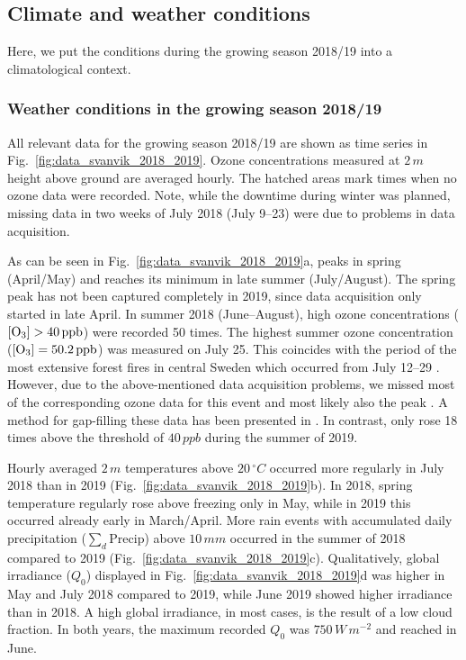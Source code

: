 \documentclass[bg, manuscript]{copernicus}
\begin{document}
\subsection{Climate and weather conditions}
\label{sec:stats}
Here, we put the conditions during the growing season 2018/19 into a climatological context.

\subsubsection{Weather conditions in the growing season 2018/19}
\label{subsec:weather}

All relevant data for the growing season 2018/19 are shown as time series in Fig.~\ref{fig:data_svanvik_2018_2019}. Ozone concentrations measured at $2\,\unit{m}$ height above ground are averaged hourly. The hatched areas mark times when no ozone data were recorded. Note, while the downtime during winter was planned, missing data in two weeks of July 2018 (July 9--23) were due to problems in data acquisition.

As can be seen in Fig.~\ref{fig:data_svanvik_2018_2019}a, \chem{[O_3]} peaks in spring (April/May) and reaches its minimum in late summer (July/August). The spring peak has not been captured completely in 2019, since data acquisition only started in late April. In summer 2018 (June--August), high ozone concentrations ($\chem{[O_3]} > 40\,\unit{ppb}$) were recorded 50 times. The highest summer ozone concentration ($\chem{[O_3]} = 50.2\,\unit{ppb}$) was measured on July 25. This coincides with the period of the most extensive forest fires in central Sweden which occurred from July 12--29 \citep{SOU2019}. However, due to the above-mentioned data acquisition problems, we missed most of the corresponding ozone data for this event and most likely also the peak \chem{[O_3]}. A method for gap-filling these data has been presented in \citet{ACP:Falk2021}. In contrast, \chem{[O_3]} only rose 18 times above the threshold of $40\,\unit{ppb}$ during the summer of 2019. 

Hourly averaged $2\,\unit{m}$ temperatures above $20\,\unit{^\circ C}$ occurred more regularly in July 2018 than in 2019 (Fig.~\ref{fig:data_svanvik_2018_2019}b). In 2018, spring temperature regularly rose above freezing only in May, while in 2019 this occurred already early in March/April.
More rain events with accumulated daily precipitation ($\sum_d \mathrm{Precip}$) above $10\,\unit{mm}$ occurred in the summer of 2018 compared to 2019 (Fig.~\ref{fig:data_svanvik_2018_2019}c).
Qualitatively, global irradiance ($Q_0$) displayed in Fig.~\ref{fig:data_svanvik_2018_2019}d was higher in May and July 2018 compared to 2019, while June 2019 showed higher irradiance than in 2018. A high global irradiance, in most cases, is the result of a low cloud fraction. In both years, the maximum recorded $Q_0$ was $750\,\unit{W\,m^{-2}}$ and reached in June.
\end{document}
